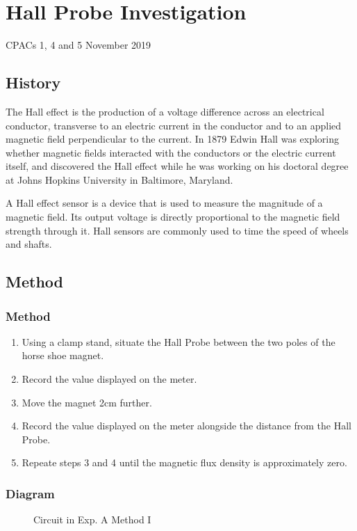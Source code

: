 \section{Hall Probe Investigation}
CPACs 1, 4 and 5
\hfill
{} November 2019

\subsection{History}
The Hall effect is the production of a voltage difference across an electrical conductor, transverse to an electric current in the conductor and to an applied magnetic field perpendicular to the current.
In 1879 Edwin Hall was exploring whether magnetic fields interacted with the conductors or the electric current itself, and discovered the Hall effect while he was working on his doctoral degree at Johns Hopkins University in Baltimore, Maryland.\cite{wiki:halleffect}
\par
A Hall effect sensor is a device that is used to measure the magnitude of a magnetic field. Its output voltage is directly proportional to the magnetic field strength through it. Hall sensors are commonly used to time the speed of wheels and shafts.\cite{wiki:sensor}

\subsection{Method}

\subsubsection{Method}
\begin{enumerate}
  \item Using a clamp stand, situate the Hall Probe between the two poles of the horse shoe magnet.
  \item Record the value displayed on the meter.
  \item Move the magnet 2cm further.
  \item Record the value displayed on the meter alongside the distance from the Hall Probe.
  \item Repeate steps 3 and 4  until the magnetic flux density is approximately zero.
\end{enumerate}

\subsubsection{Diagram}
\begin{figure}[H]
  \centering
  \caption{Circuit in Exp. A Method I}
\end{figure}

